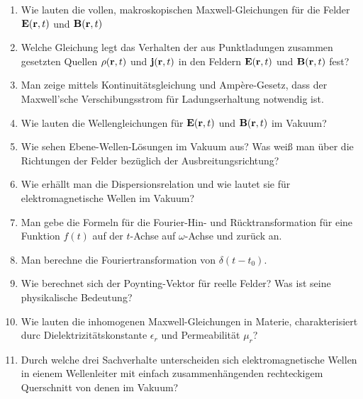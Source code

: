 \documentclass{scrartcl}
\begin{document}
  \begin{enumerate}

    \item Wie lauten die vollen, makroskopischen Maxwell-Gleichungen für
          die Felder $\vb E(\vb r, t)$ und $\vb B(\vb r, t)$

    \item Welche Gleichung legt das Verhalten der aus Punktladungen
          zusammen gesetzten Quellen $\rho(\vb r, t)$ und 
          $\vb j(\vb r, t)$ in den Feldern $\vb E(\vb r, t)$
          und $\vb B(\vb r, t)$ fest?

    \item Man zeige mittels Kontinuitätsgleichung und Ampère-Gesetz, 
          dass der Maxwell'sche Verschibungsstrom für Ladungserhaltung
          notwendig ist.

    \item Wie lauten die Wellengleichungen für $\vb E(\vb r, t)$ und
          $\vb B(\vb r, t)$ im Vakuum?

    \item Wie sehen Ebene-Wellen-Lösungen im Vakuum aus? Was weiß man
          über die Richtungen der Felder bezüglich der 
          Ausbreitungsrichtung?

    \item Wie erhällt man die Dispersionsrelation und wie lautet sie für
          elektromagnetische Wellen im Vakuum?

    \item Man gebe die Formeln für die Fourier-Hin- und Rücktransformation
          für eine Funktion $f(t)$ auf der $t$-Achse auf $\omega$-Achse und
          zurück an.

    \item Man berechne die Fouriertransformation von $\delta(t-t_0)$.

    \item Wie berechnet sich der Poynting-Vektor für reelle Felder? Was
          ist seine physikalische Bedeutung?

    \item Wie lauten die inhomogenen Maxwell-Gleichungen in Materie,
          charakterisiert durc Dielektrizitätskonstante $\epsilon_r$ und
          Permeabilität $\mu_r$?

    \item Durch welche drei Sachverhalte unterscheiden sich 
          elektromagnetische Wellen in eienem Wellenleiter mit einfach
          zusammenhängenden rechteckigem Querschnitt von denen im Vakuum?


\end{enumerate}
\end{document}
